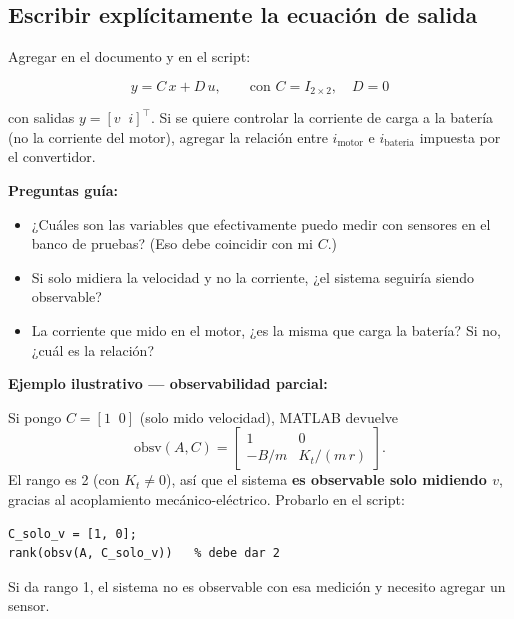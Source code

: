 \documentclass[11pt,a4paper]{article}
\begin{document}
\subsection{Escribir explícitamente la ecuación de salida}

Agregar en el documento y en el script:

\begin{equation}
y = C\,x + D\,u, \qquad \text{con } C = I_{2\times 2},\quad D = 0
\end{equation}

con salidas $y = [v\;\;i]^\top$. Si se quiere controlar la corriente de carga a la batería (no la corriente del motor), agregar la relación entre $i_{\text{motor}}$ e $i_{\text{bateria}}$ impuesta por el convertidor.

\begin{guia}
\textbf{Preguntas guía:}
\begin{itemize}
    \item ¿Cuáles son las variables que efectivamente puedo medir con sensores en el banco de pruebas? (Eso debe coincidir con mi $C$.)
    \item Si solo midiera la velocidad y no la corriente, ¿el sistema seguiría siendo observable?
    \item La corriente que mido en el motor, ¿es la misma que carga la batería? Si no, ¿cuál es la relación?
\end{itemize}
\end{guia}

\begin{ejemplo}
\textbf{Ejemplo ilustrativo --- observabilidad parcial:}

Si pongo $C = [1\;\;0]$ (solo mido velocidad), MATLAB devuelve
\[
\mathrm{obsv}(A, C) = \begin{bmatrix} 1 & 0 \\ -B/m & K_t/(m\,r) \end{bmatrix}.
\]
El rango es 2 (con $K_t \neq 0$), así que el sistema \textbf{es observable solo midiendo $v$}, gracias al acoplamiento mecánico-eléctrico. Probarlo en el script:

\begin{lstlisting}[style=matlab]
C_solo_v = [1, 0];
rank(obsv(A, C_solo_v))   % debe dar 2
\end{lstlisting}

Si da rango 1, el sistema no es observable con esa medición y necesito agregar un sensor.
\end{ejemplo}
\end{document}
